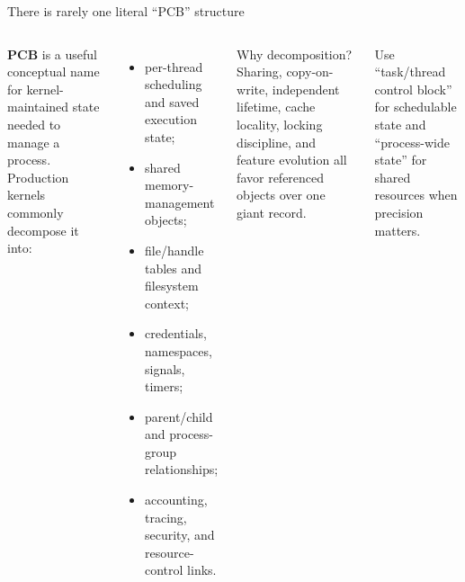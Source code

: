 \documentclass[aspectratio=169,11pt]{beamer}
\newcommand{\concept}[1]{\textcolor{osblue}{\textbf{#1}}}
\begin{document}
\begin{frame}{There is rarely one literal ``PCB'' structure}
  \begin{columns}[T,onlytextwidth]
      \concept{PCB} is a useful conceptual name for kernel-maintained state needed to manage a process. Production kernels commonly decompose it into:
      \begin{itemize}
        \item per-thread scheduling and saved execution state;
        \item shared memory-management objects;
        \item file/handle tables and filesystem context;
        \item credentials, namespaces, signals, timers;
        \item parent/child and process-group relationships;
        \item accounting, tracing, security, and resource-control links.
      \end{itemize}
      \begin{alertblock}{Why decomposition?}
        Sharing, copy-on-write, independent lifetime, cache locality, locking discipline, and feature evolution all favor referenced objects over one giant record.
      \end{alertblock}
      \begin{tcolorbox}[title=Terminology]
        Use ``task/thread control block'' for schedulable state and ``process-wide state'' for shared resources when precision matters.
      \end{tcolorbox}
  \end{columns}
\end{frame}
\end{document}
